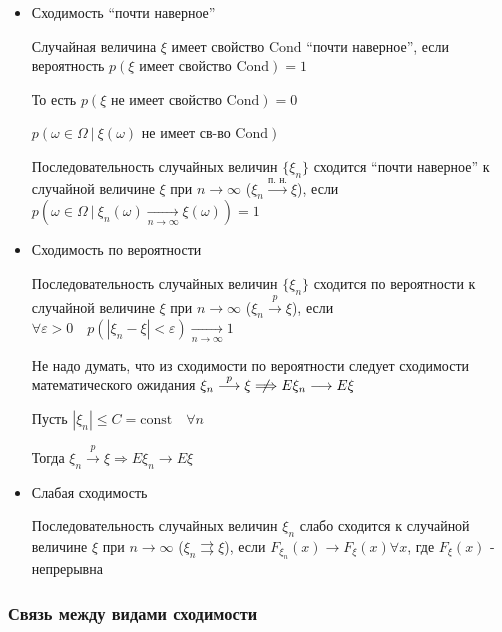 \documentclass[12pt]{article}
\begin{document}
    \begin{itemize}
        \item Сходимость \enquote{почти наверное}

        \Defs Случайная величина $\xi$ имеет свойство $\mathrm{Cond}$ \enquote{почти наверное}, если вероятность $p(\xi \text{ имеет свойство } \mathrm{Cond}) = 1$
    
        \Nota То есть $p(\xi \text{ не имеет свойство } \mathrm{Cond}) = 0$

        $p(\omega \in \Omega \ | \ \xi(\omega) \text{ не имеет св-во } \mathrm{Cond})$

        \Def Последовательность случайных величин $\{\xi_n\}$ сходится \enquote{почти наверное} к случайной величине $\xi$ при $n \to \infty$ ($\xi_n \overset{\text{п. н.}}{\longrightarrow} \xi$), 
        если $p(\omega \in \Omega \ | \ \xi_n(\omega) \underset{n \to \infty}{\longrightarrow} \xi(\omega)) = 1$

        \item Сходимость по вероятности

        \Defs Последовательность случайных величин $\{\xi_n\}$ сходится по вероятности к случайной величине $\xi$ при $n \to \infty$
        ($\xi_n \overset{p}{\longrightarrow} \xi$), если $\forall \varepsilon > 0 \quad p(|\xi_n - \xi| < \varepsilon) \underset{n \to \infty}{\longrightarrow} 1$
        
        \Nota Не надо думать, что из сходимости по вероятности следует сходимости математического ожидания $\xi_n \overset{p}{\longrightarrow} \xi \centernot{\Longrightarrow} E\xi_n \longrightarrow E\xi$

        \begin{MyTheorem}
            \Ths Пусть $|\xi_n| \leq C = \mathrm{const} \quad \forall n$

            Тогда $\xi_n \overset{p}{\longrightarrow} \xi \Longrightarrow E\xi_n \longrightarrow E\xi$
        \end{MyTheorem}

        \item Слабая сходимость

        \Defs Последовательность случайных величин $\xi_n$ слабо сходится к случайной величине $\xi$ при $n \to \infty$
        ($\xi_n \rightrightarrows \xi$), если $F_{\xi_n}(x) \longrightarrow F_\xi(x) \forall x$, где $F_\xi(x)$ - непрерывна
    
    \end{itemize}

    \subsubsection{Связь между видами сходимости}
\end{document}

